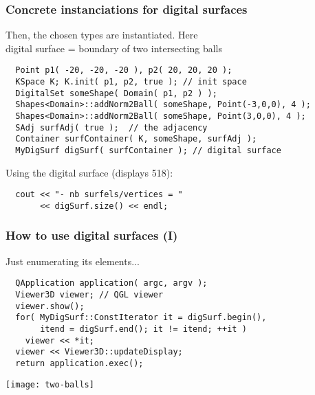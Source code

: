 \documentclass[pdftex,francais]{beamer}
\begin{document}
\begin{frame}[fragile]%
  \frametitle{Concrete instanciations for digital surfaces}

  Then, the chosen types are instantiated. Here \\
  digital surface = boundary of two intersecting balls
  \begin{lstlisting}
  Point p1( -20, -20, -20 ), p2( 20, 20, 20 );
  KSpace K; K.init( p1, p2, true ); // init space
  DigitalSet someShape( Domain( p1, p2 ) );
  Shapes<Domain>::addNorm2Ball( someShape, Point(-3,0,0), 4 );
  Shapes<Domain>::addNorm2Ball( someShape, Point(3,0,0), 4 );
  SAdj surfAdj( true );  // the adjacency
  Container surfContainer( K, someShape, surfAdj );
  MyDigSurf digSurf( surfContainer ); // digital surface
  \end{lstlisting}
  
  Using the digital surface (displays 518):
  \begin{lstlisting}
  cout << "- nb surfels/vertices = "
       << digSurf.size() << endl;
  \end{lstlisting}
  

\end{frame}

\begin{frame}[fragile]%
  \frametitle{How to use digital surfaces (I)}

  Just enumerating its elements...
  \begin{lstlisting}
  QApplication application( argc, argv );
  Viewer3D viewer; // QGL viewer
  viewer.show(); 
  for( MyDigSurf::ConstIterator it = digSurf.begin(),
	   itend = digSurf.end(); it != itend; ++it )
    viewer << *it;
  viewer << Viewer3D::updateDisplay;
  return application.exec();
  \end{lstlisting}

  \texttt{[image: two-balls]}
\end{frame}
\end{document}
